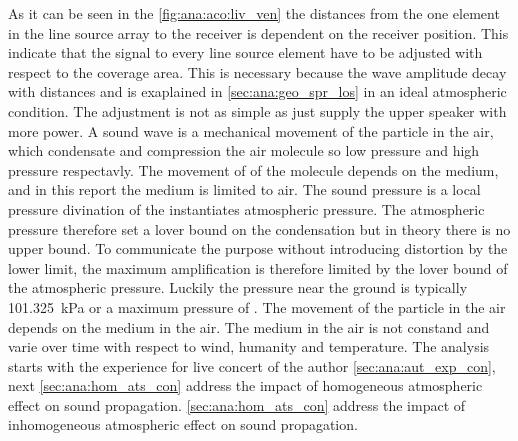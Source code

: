 As it can be seen in the \autoref{fig:ana:aco:liv_ven} the distances from the one element in the line source array to the receiver is dependent on the receiver position. This indicate that the signal to every line source element have to be adjusted with respect to the coverage area. This is necessary because the wave amplitude decay with distances and is exaplained in \autoref{sec:ana:geo_spr_los} in an ideal atmospheric condition. The adjustment is not as simple as just supply the upper speaker with more power. A sound wave is a mechanical movement of the particle in the air, which condensate and compression the air molecule so low pressure and high pressure respectavly. The movement of of the molecule depends on the medium, and in this report the medium is limited to air. The sound pressure is a local pressure divination of the instantiates atmospheric pressure. The atmospheric pressure therefore set a lover bound on the condensation but in theory there is no upper bound. To communicate the purpose without introducing distortion by the lower limit, the maximum amplification is therefore limited by the lover bound of the atmospheric pressure. Luckily the pressure near the ground is typically \SI{101.325}{\kilo\pascal} or a maximum pressure of . The movement of the particle in the air depends on the medium in the air. The medium in the air is not constand and varie over time with respect to wind, humanity and temperature. The analysis starts with the experience for live concert of the author \autoref{sec:ana:aut_exp_con}, next \autoref{sec:ana:hom_ats_con} address the impact of homogeneous atmospheric effect on sound propagation. \autoref{sec:ana:hom_ats_con} address the impact of  inhomogeneous atmospheric effect on sound propagation. 


